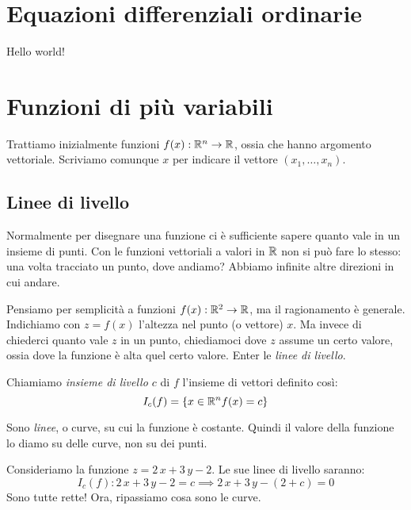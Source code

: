 



\maketitle

\tableofcontents

\chapter{Equazioni differenziali ordinarie}

Hello world!

\chapter{Funzioni di pi\`u variabili}

Trattiamo inizialmente funzioni $f(x) : \mathbb{R}^n \to \mathbb{R}$, ossia che hanno
argomento vettoriale. Scriviamo comunque $x$ per indicare il vettore $(x_1, \ldots, x_n)$.

\section{Linee di livello}

Normalmente per disegnare una funzione ci \`e sufficiente sapere quanto vale in
un insieme di punti. Con le funzioni vettoriali a valori in $\mathbb{R}$ non 
si pu\`o fare lo stesso: una volta tracciato un punto, dove andiamo? Abbiamo 
infinite altre direzioni in cui andare.

Pensiamo per semplicit\`a a funzioni $f(x) : \mathbb{R}^2 \to \mathbb{R}$, ma il 
ragionamento \`e generale. Indichiamo con $z = f(x)$  l'altezza nel punto 
(o vettore) $x$. Ma invece di chiederci quanto vale $z$ in un punto, chiediamoci 
dove $z$ assume un certo valore, ossia dove la funzione \`e alta quel certo valore.
Enter le \emph{linee di livello}.

\begin{defn}
        Chiamiamo \emph{insieme di livello $c$} di $f$ l'insieme di vettori definito
        cos\`i:
        \[
                I_{c}(f) = \{ x \in \mathbb{R}^n f(x) = c \}
        \]
\end{defn}

Sono \emph{linee}, o curve, su cui la funzione \`e costante. Quindi il valore della funzione 
lo diamo su delle curve, non su dei punti.

Consideriamo la funzione $z = 2 \, x + 3 \, y - 2$. Le sue linee di livello saranno: 
\[
        I_{c} (f) : 2 \, x + 3 \, y - 2 = c \implies 2 \, x + 3 \, y - (2 + c) = 0
\]
Sono tutte rette!
Ora, ripassiamo cosa sono le curve.

